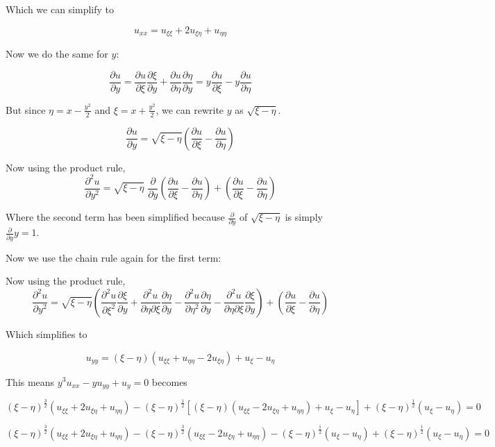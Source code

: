 \documentclass[
]{article}
\begin{document}
Which we can simplify to

\[u_{xx}= u_{\xi \xi}+2 u_{\xi \eta}+u_{\eta \eta}\]

Now we do the same for \(y\):

\[\frac{\partial u}{\partial y} = \frac{\partial u}{\partial \xi} \frac{\partial \xi}{\partial y}+\frac{\partial u}{\partial\eta}\frac{\partial\eta}{\partial y} = y\frac{\partial u}{\partial \xi}-y\frac{\partial u}{\partial\eta}\]

But since \(\eta=x-\frac{y^2}{2}\) and \(\xi=x+\frac{y^2}{2}\), we can
rewrite \(y\) as \(\sqrt{\xi-\eta}\).

\[\frac{\partial u}{\partial y} = \sqrt{\xi-\eta} \left(\frac{\partial u}{\partial \xi}-\frac{\partial u}{\partial\eta}\right)\]

Now using the product rule,
\[\frac{\partial^2 u}{\partial y^2} = \sqrt{\xi-\eta}\; \frac{\partial}{\partial y}\left(\frac{\partial u}{\partial \xi}-\frac{\partial u}{\partial\eta}\right)+\left(\frac{\partial u}{\partial \xi}-\frac{\partial u}{\partial\eta}\right)\]

Where the second term has been simplified because
\(\frac{\partial}{\partial y}\) of \(\sqrt{\xi-\eta}\) is simply
\(\frac{\partial}{\partial y}y=1\).

Now we use the chain rule again for the first term:

Now using the product rule,
\[\frac{\partial^2 u}{\partial y^2} = \sqrt{\xi-\eta}\left(\frac{\partial^2 u}{\partial \xi^2} \frac{\partial \xi}{\partial y}+
\frac{\partial^2 u}{\partial\eta \partial \xi}\frac{\partial\eta}{\partial y} -
\frac{\partial^2 u}{\partial \eta^2}\frac{\partial \eta}{\partial y}-
\frac{\partial^2 u}{\partial \eta \partial \xi}\frac{\partial \xi}{\partial y}\right)
+
\left(\frac{\partial u}{\partial \xi}-\frac{\partial u}{\partial\eta}\right)\]

Which simplifies to

\[u_{yy}= \left(\xi-\eta \right)\left(u_{\xi \xi}+u_{\eta \eta} -2 u_{\xi \eta}\right) +u_\xi-u_\eta\]

This means \(y^3u_{xx}-yu_{yy}+u_y=0\) becomes

\[\left(\xi-\eta \right)^{\frac{3}{2}} \left(u_{\xi \xi}+2 u_{\xi \eta}+u_{\eta \eta}\right) - \left(\xi-\eta \right)^{\frac{1}{2}} \left[\left(\xi-\eta \right)\left(u_{\xi \xi}-2 u_{\xi \eta}+u_{\eta \eta} \right) +u_\xi-u_\eta \right]+\left(\xi-\eta \right)^{\frac{1}{2}} \left(u_\xi-u_\eta\right)=0  \]

\[\left(\xi-\eta \right)^{\frac{3}{2}} \left(u_{\xi \xi}+2 u_{\xi \eta}+
u_{\eta \eta}\right) - \left(\xi-\eta \right)^{\frac{3}{2}} \left(u_{\xi \xi}-2 u_{\xi \eta}+
u_{\eta \eta}\right)-
\left(\xi-\eta \right)^{\frac{1}{2}} \left(u_\xi-u_\eta\right)+
\left(\xi-\eta \right)^{\frac{1}{2}} \left(u_\xi-u_\eta\right)=0  \]
\end{document}
